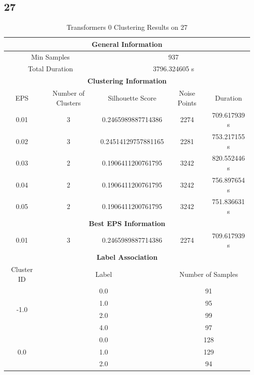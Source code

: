 \subsection{27}

\begin{longtable}{|c|c|c|c|c|}
\caption{Transformers 0 Clustering Results on 27} \label{tab:27_transformers_0_clustering_results}\\
\hline
\multicolumn{5}{|c|}{\textbf{General Information}} \\
\hline
\multicolumn{2}{|c|}{Min Samples} & \multicolumn{3}{c|}{937} \\
\multicolumn{2}{|c|}{Total Duration} & \multicolumn{3}{c|}{3796.324605 s} \\
\hline
\multicolumn{5}{|c|}{\textbf{Clustering Information}} \\
\hline
EPS & Number of Clusters & Silhouette Score & Noise Points & Duration \\
0.01 & 3 & 0.2465989887714386 & 2274 & 709.617939 s\\
0.02 & 3 & 0.24514129757881165 & 2281 & 753.217155 s\\
0.03 & 2 & 0.1906411200761795 & 3242 & 820.552446 s\\
0.04 & 2 & 0.1906411200761795 & 3242 & 756.897654 s\\
0.05 & 2 & 0.1906411200761795 & 3242 & 751.836631 s\\
\hline
\multicolumn{5}{|c|}{\textbf{Best EPS Information}} \\
\hline
0.01 & 3 & 0.2465989887714386 & 2274 & 709.617939 s\\
\hline
\multicolumn{5}{|c|}{\textbf{Label Association}} \\
\hline
Cluster ID & \multicolumn{2}{c|}{Label} & \multicolumn{2}{c|}{Number of Samples} \\
\hline
\multirow{4}{*}{-1.0} & \multicolumn{2}{c|}{0.0} & \multicolumn{2}{c|}{91} \\
& \multicolumn{2}{c|}{1.0} & \multicolumn{2}{c|}{95} \\
& \multicolumn{2}{c|}{2.0} & \multicolumn{2}{c|}{99} \\
& \multicolumn{2}{c|}{4.0} & \multicolumn{2}{c|}{97} \\
\hline
\multirow{4}{*}{0.0} & \multicolumn{2}{c|}{0.0} & \multicolumn{2}{c|}{128} \\
& \multicolumn{2}{c|}{1.0} & \multicolumn{2}{c|}{129} \\
& \multicolumn{2}{c|}{2.0} & \multicolumn{2}{c|}{94} \\

\end{longtable}
